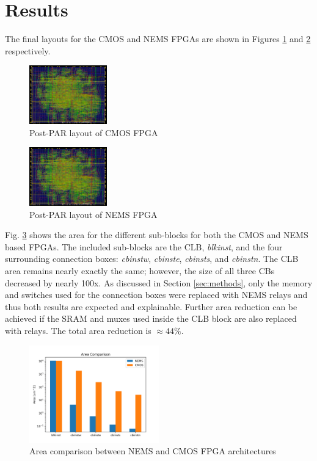\documentclass[twoside,twocolumn]{article}
\begin{document}
\section{Results}
The final layouts for the CMOS and NEMS FPGAs are shown in Figures \ref{fig:cmos}
and \ref{fig:nems} respectively. 

\begin{figure}[!hbt]
    \centering
    \caption{Post-PAR layout of CMOS FPGA}
    \label{fig:cmos}
    \includegraphics[width=0.3\textwidth]{figs/cmos_innovus.png}
\end{figure}

\begin{figure}[!hbt]
    \centering
    \caption{Post-PAR layout of NEMS FPGA}
    \label{fig:nems}
    \includegraphics[width=0.3\textwidth]{figs/cmos_innovus.png}
\end{figure}

Fig. \ref{fig:area} shows the area for the different sub-blocks
for both the CMOS and NEMS based FPGAs. The included sub-blocks are the CLB,
\textit{blkinst}, and the four surrounding connection boxes: \textit{cbinstw}, 
\textit{cbinste}, \textit{cbinsts}, and \textit{cbinstn}. The CLB area remains 
nearly exactly the same; however, the size of all three CBs decreased by nearly 
100x. As discussed in Section \ref{sec:methods}, only the memory and switches
used for the connection boxes were replaced with NEMS relays and thus both 
results are expected and explainable. Further area reduction can be achieved
if the SRAM and muxes used inside the CLB block are also replaced with relays.
The total area reduction is $\approx 44\%$. 

\begin{figure}[!hbt]
    \centering
    \caption{Area comparison between NEMS and CMOS FPGA architectures}
    \label{fig:area}
    \includegraphics[width=0.5\textwidth]{figs/area_comparison.png}
\end{figure}
\end{document}
